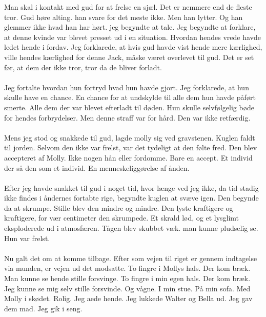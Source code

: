 \documentclass[]{article}
\begin{document}
Man skal i kontakt med gud for at frelse en sjæl. Det er nemmere end de fleste tror. Gud høre alting. han svare for det meste ikke. Men han lytter. Og han glemmer ikke hvad han har hørt. jeg begyndte at tale. Jeg begyndte at forklare, at denne kvinde var blevet presset ud i en situation. Hvordan hendes vrede havde ledet hende i fordav. Jeg forklarede, at hvis gud havde vist hende mere kærlighed, ville hendes kærlighed for denne Jack, måske været overlevet til gud. Det er set før, at dem der ikke tror, tror da de bliver forladt.
\\ \\
Jeg fortalte hvordan hun fortryd hvad hun havde gjort. Jeg forklarede, at hun skulle have en chance. En chance for at undskylde til alle dem hun havde påført smerte. Alle dem der var blevet efterladt til døden. Hun skulle selvfølgelig bøde for hendes forbrydelser. Men denne straff var for hård. Den var ikke retfærdig. 
\\ \\
Mens jeg stod og snakkede til gud, lagde molly sig ved gravstenen. Kuglen faldt til jorden. Selvom den ikke var frelst, var det tydeligt at den følte fred. Den blev accepteret af Molly. Ikke nogen hån eller fordomme. Bare en accept. Et individ der så den som et individ. En menneskeliggørelse af ånden.
\\ \\
Efter jeg havde snakket til gud i noget tid, hvor længe ved jeg ikke, da tid stadig ikke findes i åndernes fortabte rige, begyndte kuglen at svæve igen. Den begynde da at skrumpe. Stille blev den mindre og mindre. Den lyste kraftigere og kraftigere, for vær centimeter den skrumpede. Et skrald lød, og et lysglimt eksploderede ud i atmosfæren. Tågen blev skubbet væk. man kunne pludselig se. Hun var frelst.
\\ \\
Nu galt det om at komme tilbage. Efter som vejen til riget er gennem indtagelse via munden, er vejen ud det modsatte. To fingre i Mollys hals. Der kom bræk. Man kunne se hende stille forsvinge. To fingre i min egen hals. Der kom bræk. Jeg kunne se mig selv stille forsvinde. Og vågne. I min stue. På min sofa. Med Molly i skødet. Rolig. Jeg aede hende. Jeg lukkede Walter og Bella ud. Jeg gav dem mad. Jeg gik i seng.
\end{document}
